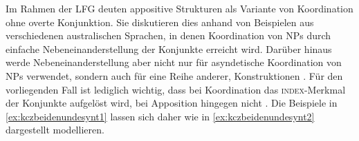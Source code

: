 Im Rahmen der LFG deuten \citet{sadlernordlinger2006} appositive Strukturen als
Variante von Koordination ohne overte Konjunktion. Sie diskutieren dies anhand
von Beispielen aus verschiedenen australischen Sprachen, in denen Koordination
von NPs durch einfache Nebeneinanderstellung der Konjunkte erreicht wird.
Darüber hinaus werde Nebeneinanderstellung aber nicht nur für asyndetische
Koordination von NPs verwendet, sondern auch für eine Reihe anderer,
 Konstruktionen
\autocite[440--441]{sadlernordlinger2006}. Für den vorliegenden Fall ist
lediglich wichtig, dass bei Koordination das \textsc{index}-Merkmal der Konjunkte
aufgelöst wird, bei Apposition hingegen nicht
\autocite[444]{sadlernordlinger2006}. Die Beispiele in
\cref{ex:kczbeidenundesynt1} lassen sich daher wie in
\cref{ex:kczbeidenundesynt2} dargestellt modellieren.

